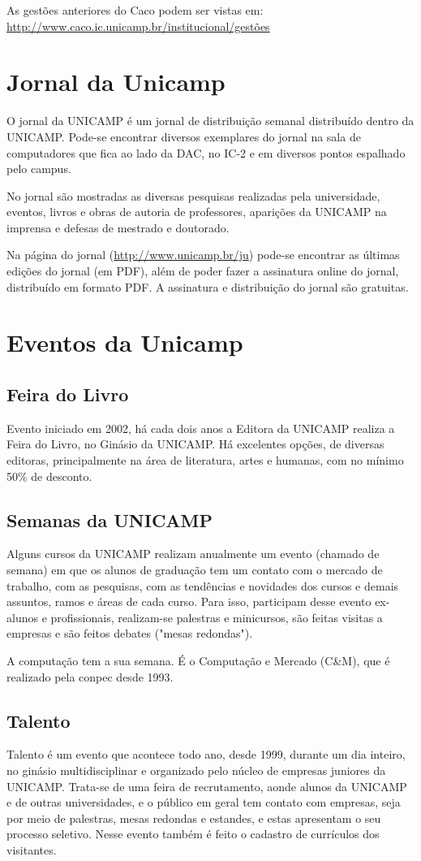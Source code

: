 \documentclass[a4paper,10pt, twocolumn]{article}
\begin{document}
As gestões anteriores do Caco podem ser vistas em:
\url{http://www.caco.ic.unicamp.br/institucional/gestões}

\section{Jornal da Unicamp}
O jornal da UNICAMP é um jornal de distribuição semanal distribuído dentro da
UNICAMP. Pode-se encontrar diversos exemplares do jornal na sala de computadores
que fica ao lado da DAC, no IC-2 e em diversos pontos espalhado pelo campus.

No jornal são mostradas as diversas pesquisas realizadas pela universidade,
eventos, livros e obras de autoria de professores, aparições da UNICAMP na
imprensa e defesas de mestrado e doutorado.

Na página do jornal (\url{http://www.unicamp.br/ju}) pode-se encontrar as
últimas edições do jornal (em PDF), além de poder fazer a assinatura online do
jornal, distribuído em formato PDF. A assinatura e distribuição do jornal são
gratuitas.

\section{Eventos da Unicamp}
\subsection{Feira do Livro}
Evento iniciado em 2002, há cada dois anos a Editora da UNICAMP realiza a Feira
do Livro, no Ginásio da UNICAMP. Há excelentes opções, de diversas editoras,
principalmente na área de literatura, artes e humanas, com no mínimo 50\% de
desconto.

\subsection{Semanas da UNICAMP}
Alguns cursos da UNICAMP realizam anualmente um evento (chamado de semana) em
que os alunos de graduação tem um contato com o mercado de trabalho, com as
pesquisas, com as tendências e novidades dos cursos e demais assuntos, ramos
e áreas de cada curso. Para isso, participam desse evento ex-alunos
e profissionais, realizam-se palestras e minicursos, são feitas visitas
a empresas e são feitos debates ("mesas redondas").

A computação tem a sua semana. É o Computação e Mercado (C\&M), que é realizado
pela conpec desde 1993.

\subsection{Talento}
Talento é um evento que acontece todo ano, desde 1999, durante um dia inteiro,
no ginásio multidisciplinar e organizado pelo núcleo de empresas juniores da
UNICAMP. Trata-se de uma feira de recrutamento, aonde alunos da UNICAMP e de
outras universidades, e o público em geral tem contato com empresas, seja por
meio de palestras, mesas redondas e estandes, e estas apresentam o seu processo
seletivo. Nesse evento também é feito o cadastro de currículos dos visitantes.
\end{document}
